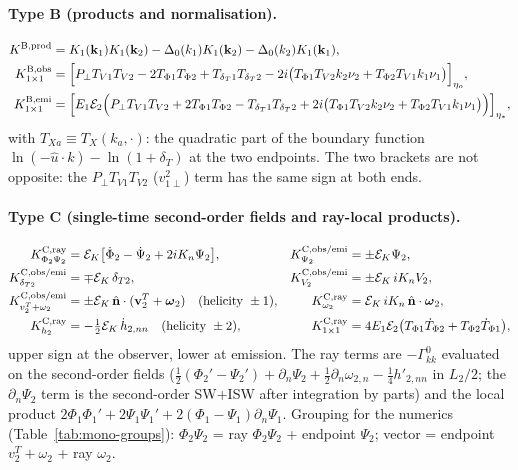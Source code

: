 \paragraph{Type B (products and normalisation).}
\begin{align}
K^{\rm B,prod}&=K_1(\mathbf k_1)K_1(\mathbf k_2)-\Delta_0(k_1)K_1(\mathbf k_2)-\Delta_0(k_2)K_1(\mathbf k_1),\nonumber\\
K^{\rm B,obs}_{1\times1}&=\Big[P_\perp T_{V1}T_{V2}-2T_{\Phi1}T_{\Phi2}+T_{\delta_T1}T_{\delta_T2}-2i\big(T_{\Phi1}T_{V2}k_2\nu_2+T_{\Phi2}T_{V1}k_1\nu_1\big)\Big]_{\eta_o},\nonumber\\
K^{\rm B,emi}_{1\times1}&=\Big[E_1\mathcal E_2\Big(P_\perp T_{V1}T_{V2}+2T_{\Phi1}T_{\Phi2}-T_{\delta_T1}T_{\delta_T2}+2i\big(T_{\Phi1}T_{V2}k_2\nu_2+T_{\Phi2}T_{V1}k_1\nu_1\big)\Big)\Big]_{\eta_*},
\label{eq:asm-chB}
\end{align}
with $T_{Xa}\equiv T_X(k_a,\cdot)$: the quadratic part of the boundary function $\ln(-\hat u\cdot k)-\ln(1+\delta_T)$ at the two
endpoints.  The two brackets are not opposite: the $P_\perp T_{V1}T_{V2}$ ($v_{1\perp}^2$) term has the same sign at both ends.

\paragraph{Type C (single-time second-order fields and ray-local products).}
\begin{align}
K^{\rm C,ray}_{\Phi_2\Psi_2}&=\mathcal E_K\big[\dot\Phi_2-\dot\Psi_2+2iK_n\Psi_2\big], &
K^{\rm C,obs/emi}_{\Psi_2}&=\pm \mathcal E_K\Psi_2,\nonumber\\
K^{\rm C,obs/emi}_{\delta_{T2}}&=\mp \mathcal E_K\,\delta_{T2}, &
K^{\rm C,obs/emi}_{V_2}&=\pm \mathcal E_K\,iK_nV_2,\nonumber\\
K^{\rm C,obs/emi}_{v^T_2+\omega_2}&=\pm \mathcal E_K\,\hat{\mathbf n}\cdot(\mathbf v^T_2+\boldsymbol\omega_2)\quad(\text{helicity }\pm1), &
K^{\rm C,ray}_{\omega_2}&=\mathcal E_K\,iK_n\,\hat{\mathbf n}\cdot\boldsymbol\omega_2,\nonumber\\
K^{\rm C,ray}_{h_2}&=-\tfrac12\mathcal E_K\,\dot h_{2,nn}\quad(\text{helicity }\pm2), &
K^{\rm C,ray}_{1\times1}&=4E_1\mathcal E_2\big(T_{\Phi1}\dot T_{\Phi2}+T_{\Phi2}\dot T_{\Phi1}\big),
\label{eq:asm-chC}
\end{align}
upper sign at the observer, lower at emission.  The ray terms are $-\Gamma^0_{kk}$ evaluated on the second-order fields
($\tfrac12(\Phi_2'-\Psi_2')+\partial_n\Psi_2+\tfrac12\partial_n\omega_{2,n}-\tfrac14h'_{2,nn}$ in $L_2/2$; the $\partial_n\Psi_2$ term is
the second-order SW+ISW after integration by parts) and the local product $2\Phi_1\Phi_1'+2\Psi_1\Psi_1'+2(\Phi_1-\Psi_1)\partial_n\Psi_1$.
Grouping for the numerics (Table~\ref{tab:mono-groups}): $\Phi_2\Psi_2$ = ray $\Phi_2\Psi_2$ + endpoint $\Psi_2$; vector = endpoint
$v^T_2+\omega_2$ + ray $\omega_2$.

